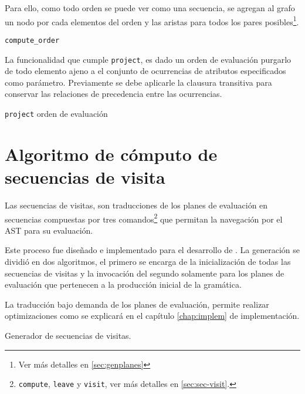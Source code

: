 Para ello, como todo orden se puede ver como una secuencia, se agregan al grafo un nodo por cada elementos del orden y las aristas para todos los pares posibles\footnote{Ver más detalles en \ref{sec:genplanes}}.

\begin{algorithm}[H]

\caption{\texttt{compute\_order}}
\end{algorithm}

La funcionalidad que cumple \texttt{project}, es dado un orden de evaluación purgarlo de todo elemento ajeno a el conjunto de ocurrencias de atributos especificados como parámetro. Previamente se debe aplicarle la clausura transitiva para conservar las relaciones de precedencia entre las ocurrencias.

\begin{algorithm}[H]

\caption{\texttt{project} orden de evaluación}
\end{algorithm}

\section{Algoritmo de cómputo de secuencias de visita}
\label{sec:algseqvisit}

Las secuencias de visitas, son traducciones de los planes de evaluación en secuencias compuestas por tres comandos\footnote{\texttt{compute}, \texttt{leave} y \texttt{visit}, ver más detalles en \ref{sec:sec-visit}.} que permitan la navegación por el AST para su evaluación.

Este proceso fue diseñado e implementado para el desarrollo de \maggen. La generación se dividió en dos algoritmos, el primero se encarga de la inicialización de todas las secuencias de visitas y la invocación del segundo solamente para los planes de evaluación que pertenecen a la producción inicial de la gramática.

La traducción bajo demanda de los planes de evaluación, permite realizar optimizaciones como se explicará en el capítulo \ref{chap:implem} de implementación.

\begin{algorithm}[H]

\caption{Generador de secuencias de visitas.}
\end{algorithm}

